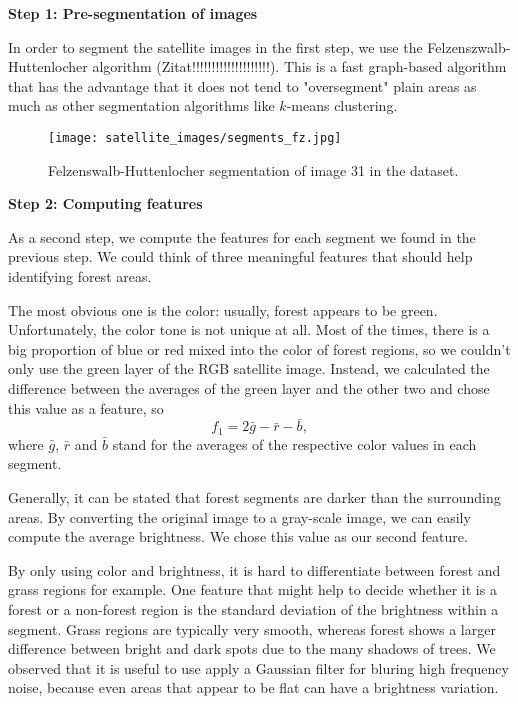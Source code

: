 \textbf{Step 1: Pre-segmentation of images}

In order to segment the satellite images in the first step, we use the Felzenszwalb-Huttenlocher algorithm (Zitat!!!!!!!!!!!!!!!!!!!!). This is a fast graph-based algorithm that has the advantage that it does not tend to "oversegment" plain areas as much as other segmentation algorithms like $k$-means clustering.

\begin{figure}[h]
	\centering
	\texttt{[image: satellite\_images/segments\_fz.jpg]}
	\caption{Felzenswalb-Huttenlocher segmentation of image 31 in the dataset.}
\end{figure}

\textbf{Step 2: Computing features}

As a second step, we compute the features for each segment we found in the previous step. We could think of three meaningful features that should help identifying forest areas. 

The most obvious one is the color: usually, forest appears to be green. Unfortunately, the color tone is not unique at all. Most of the times, there is a big proportion of blue or red mixed into the color of forest regions, so we couldn't only use the green layer of the RGB satellite image. Instead, we calculated the difference between the averages of the green layer and the other two and chose this value as a feature, so
\begin{equation}
	f_1=2\bar{g}-\bar{r}-\bar{b},
\end{equation}
where $\bar{g}$, $\bar{r}$ and $\bar{b}$ stand for the averages of the respective color values in each segment.

Generally, it can be stated that forest segments are darker than the surrounding areas. By converting the original image to a gray-scale image, we can easily compute the average brightness. We chose this value as our second feature.

By only using color and brightness, it is hard to differentiate between forest and grass regions for example. One feature that might help to decide whether it is a forest or a non-forest region is the standard deviation of the brightness within a segment. Grass regions are typically very smooth, whereas forest shows a larger difference between bright and dark spots due to the many shadows of trees. We observed that it is useful to use apply a Gaussian filter for bluring high frequency noise, because even areas that appear to be flat can have a brightness variation.

